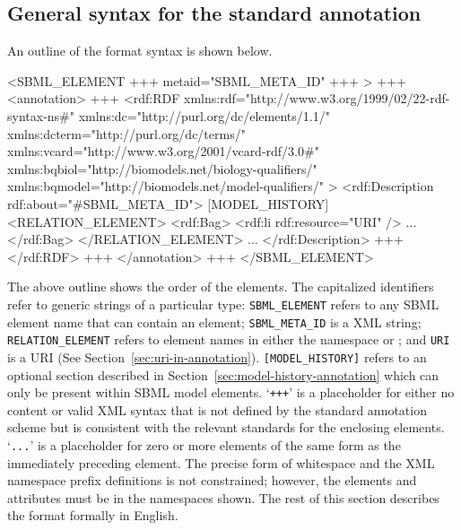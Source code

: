 \clearpage

\subsection{General syntax for the standard annotation}

An outline of the format syntax is shown below.

\vspace*{0.1ex}

\begin{example}
<SBML_ELEMENT +++ metaid="SBML_META_ID" +++ >
  +++
  <annotation>
    +++
    <rdf:RDF
      xmlns:rdf="http://www.w3.org/1999/02/22-rdf-syntax-ns\#"
      xmlns:dc="http://purl.org/dc/elements/1.1/"
      xmlns:dcterm="http://purl.org/dc/terms/"
      xmlns:vcard="http://www.w3.org/2001/vcard-rdf/3.0\#"
      xmlns:bqbiol="http://biomodels.net/biology-qualifiers/"
      xmlns:bqmodel="http://biomodels.net/model-qualifiers/"
    >
      <rdf:Description rdf:about="#SBML_META_ID">
        [MODEL_HISTORY]
        <RELATION_ELEMENT>
          <rdf:Bag>
            <rdf:li rdf:resource="URI" />
            ...
          </rdf:Bag>
        </RELATION_ELEMENT>
        ...
      </rdf:Description>
      +++
    </rdf:RDF>
    +++
  </annotation>
  +++
</SBML_ELEMENT>
\end{example}

The above outline shows the order of the elements. The capitalized
identifiers refer to generic strings of a particular type:
\texttt{SBML\_ELEMENT} refers to any SBML element name that can
contain an  element; \texttt{SBML\_META\_ID} is
a XML  string; \texttt{RELATION\_ELEMENT} refers to
element names in either the namespace
 or
; and \texttt{URI} is
a URI (See Section~\ref{sec:uri-in-annotation}).  
\texttt{[MODEL\_HISTORY]} refers to an optional section
described in Section~\ref{sec:model-history-annotation} which can
only be present within SBML model elements. `\texttt{+++}' is a
placeholder for either no content or valid XML syntax that is not
defined by the standard annotation scheme but is consistent with
the relevant standards for the enclosing elements. `\texttt{...}'
is a placeholder for zero or more elements of the same form as the
immediately preceding element.  The precise form of whitespace and
the XML namespace prefix definitions is not constrained; however,
the elements and attributes must be in the namespaces shown. The
rest of this section describes the format formally in English.

